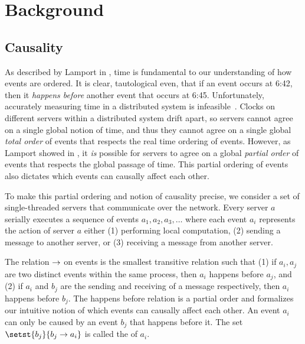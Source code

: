 \newcommand{\ttt}[1]{\texttt{#1}}

\section{Background}

\subsection{Causality}
As described by Lamport in \cite{lamport1978time}, time is fundamental to our
understanding of how events are ordered. It is clear, tautological even, that if
an event occurs at 6:42, then it \emph{happens before} another event that
occurs at 6:45. Unfortunately, accurately measuring time in a distributed
system is infeasible~\cite{marzullo1984maintaining, sampath2012synchronization,
schmid2000orthogonal}. Clocks on different servers within a distributed system
drift apart, so servers cannot agree on a single global notion of time, and
thus they cannot agree on a single global \emph{total order} of events that
respects the real time ordering of events. However, as Lamport showed in
\cite{lamport1978time}, it \emph{is} possible for servers to agree on a global
\emph{partial order} of events that respects the global passage of time. This
partial ordering of events also dictates which events can causally affect each
other.

To make this partial ordering and notion of causality precise, we consider a
set of single-threaded servers that communicate over the network. Every server
$a$ serially executes a sequence of events $a_1, a_2, a_3, \ldots$ where each
event $a_i$ represents the action of server $a$ either (1) performing local
computation, (2) sending a message to another server, or (3) receiving a
message from another server.



The  relation $\to$ on events is the
smallest transitive relation such that
%
(1)
  if $a_i, a_j$ are two distinct events within the same process, then $a_i$
  happens before $a_j$, and
(2)
  if $a_i$ and $b_j$ are the sending and receiving of a message respectively,
  then $a_i$ happens before $b_j$.
%
The happens before relation is a partial order and formalizes our intuitive
notion of which events can causally affect each other.  An event $a_i$ can only
be caused by an event $b_j$ that happens before it.  The set $\setst{b_j}{b_j
\happensbefore a_i}$ is called the  of $a_i$.

